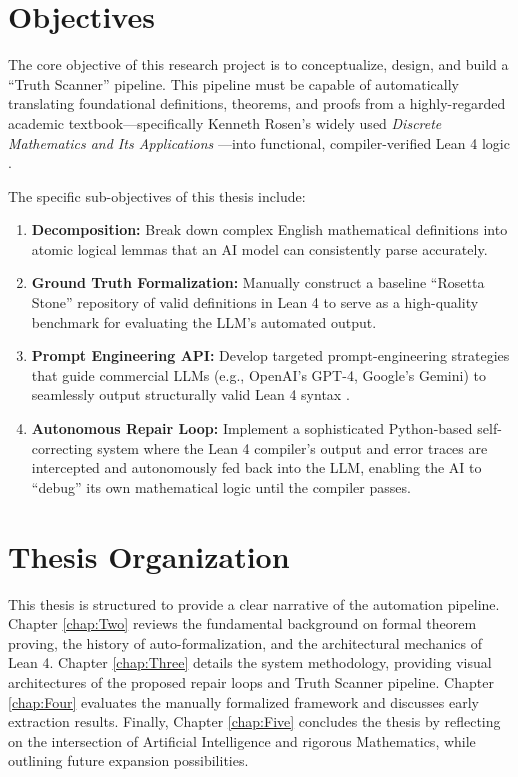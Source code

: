 \section{Objectives}
The core objective of this research project is to conceptualize, design, and build a ``Truth Scanner'' pipeline. This pipeline must be capable of automatically translating foundational definitions, theorems, and proofs from a highly-regarded academic textbook—specifically Kenneth Rosen's widely used \textit{Discrete Mathematics and Its Applications} \cite{rosen2019}—into functional, compiler-verified Lean 4 logic \cite{lean4_doc}. 

The specific sub-objectives of this thesis include:
\begin{enumerate}
    \item \textbf{Decomposition:} Break down complex English mathematical definitions into atomic logical lemmas that an AI model can consistently parse accurately.
    \item \textbf{Ground Truth Formalization:} Manually construct a baseline ``Rosetta Stone'' repository of valid definitions in Lean 4 to serve as a high-quality benchmark for evaluating the LLM's automated output.
    \item \textbf{Prompt Engineering API:} Develop targeted prompt-engineering strategies that guide commercial LLMs (e.g., OpenAI's GPT-4, Google's Gemini) to seamlessly output structurally valid Lean 4 syntax \cite{llm_codegen}.
    \item \textbf{Autonomous Repair Loop:} Implement a sophisticated Python-based self-correcting system where the Lean 4 compiler's output and error traces are intercepted and autonomously fed back into the LLM, enabling the AI to ``debug'' its own mathematical logic until the compiler passes.
\end{enumerate}

\section{Thesis Organization}
This thesis is structured to provide a clear narrative of the automation pipeline. Chapter \ref{chap:Two} reviews the fundamental background on formal theorem proving, the history of auto-formalization, and the architectural mechanics of Lean 4. Chapter \ref{chap:Three} details the system methodology, providing visual architectures of the proposed repair loops and Truth Scanner pipeline. Chapter \ref{chap:Four} evaluates the manually formalized framework and discusses early extraction results. Finally, Chapter \ref{chap:Five} concludes the thesis by reflecting on the intersection of Artificial Intelligence and rigorous Mathematics, while outlining future expansion possibilities.